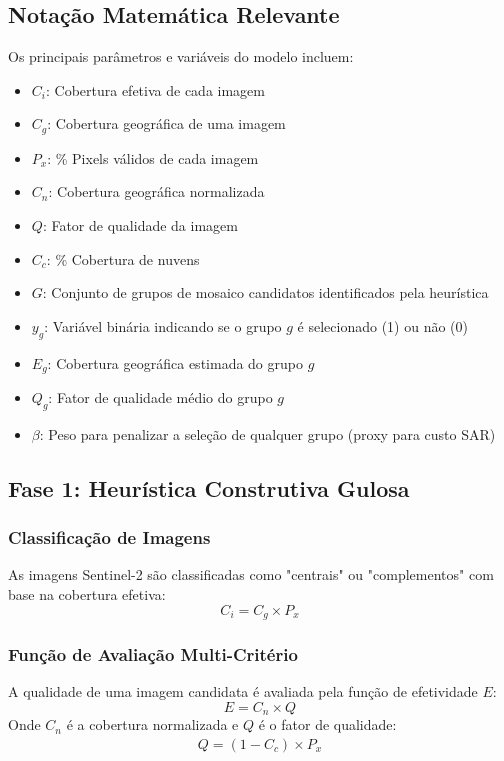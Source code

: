 \documentclass[a4paper,11pt]{article}
\begin{document}
\subsection{Notação Matemática Relevante}
Os principais parâmetros e variáveis do modelo incluem:
\begin{multicols}{2}
    \begin{itemize}[leftmargin=*,noitemsep,topsep=0pt]
        \item $C_i$: Cobertura efetiva de cada imagem 
        \item $C_g$: Cobertura geográfica de uma imagem
        \item $P_x$: \% Pixels válidos de cada imagem 
        \item $C_n$: Cobertura geográfica normalizada
        \item $Q$: Fator de qualidade da imagem
        \item $C_c$: \% Cobertura de nuvens
        \item $G$: Conjunto de grupos de mosaico candidatos identificados pela heurística
        \item $y_g$: Variável binária indicando se o grupo $g$ é selecionado (1) ou não (0)
        \item $E_g$: Cobertura geográfica estimada do grupo $g$
        \item $Q_g$: Fator de qualidade médio do grupo $g$
        \item $\beta$: Peso para penalizar a seleção de qualquer grupo (proxy para custo SAR)
    \end{itemize}
    \end{multicols}
    

\subsection{Fase 1: Heurística Construtiva Gulosa}

\subsubsection{Classificação de Imagens}
As imagens Sentinel-2 são classificadas como "centrais" ou "complementos" com base na cobertura efetiva:
\begin{equation}
C_i = C_g \times P_x
\end{equation}

\subsubsection{Função de Avaliação Multi-Critério}
A qualidade de uma imagem candidata é avaliada pela função de efetividade $E$:
\begin{equation}
E = C_n \times Q
\end{equation}
Onde $C_n$ é a cobertura normalizada e $Q$ é o fator de qualidade:
\begin{align}
Q = (1 - C_c) \times P_x
\end{align}
\end{document}
